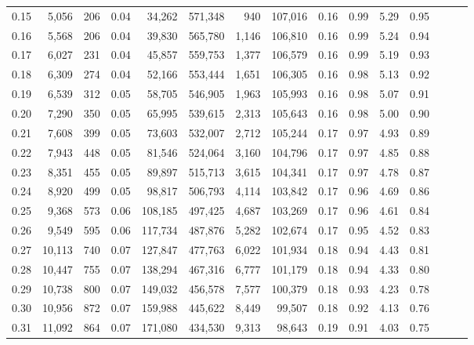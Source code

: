 \begin{tabular}{rrrrrrrrrrrrrrr}
0.15 &   5,056 &    206 &  0.04 &   34,262 &  571,348 &      940 &  107,016 &  0.16 &  0.99 &  5.29 &      0.95 \\
0.16 &   5,568 &    206 &  0.04 &   39,830 &  565,780 &    1,146 &  106,810 &  0.16 &  0.99 &  5.24 &      0.94 \\
0.17 &   6,027 &    231 &  0.04 &   45,857 &  559,753 &    1,377 &  106,579 &  0.16 &  0.99 &  5.19 &      0.93 \\
0.18 &   6,309 &    274 &  0.04 &   52,166 &  553,444 &    1,651 &  106,305 &  0.16 &  0.98 &  5.13 &      0.92 \\
0.19 &   6,539 &    312 &  0.05 &   58,705 &  546,905 &    1,963 &  105,993 &  0.16 &  0.98 &  5.07 &      0.91 \\
0.20 &   7,290 &    350 &  0.05 &   65,995 &  539,615 &    2,313 &  105,643 &  0.16 &  0.98 &  5.00 &      0.90 \\
0.21 &   7,608 &    399 &  0.05 &   73,603 &  532,007 &    2,712 &  105,244 &  0.17 &  0.97 &  4.93 &      0.89 \\
0.22 &   7,943 &    448 &  0.05 &   81,546 &  524,064 &    3,160 &  104,796 &  0.17 &  0.97 &  4.85 &      0.88 \\
0.23 &   8,351 &    455 &  0.05 &   89,897 &  515,713 &    3,615 &  104,341 &  0.17 &  0.97 &  4.78 &      0.87 \\
0.24 &   8,920 &    499 &  0.05 &   98,817 &  506,793 &    4,114 &  103,842 &  0.17 &  0.96 &  4.69 &      0.86 \\
0.25 &   9,368 &    573 &  0.06 &  108,185 &  497,425 &    4,687 &  103,269 &  0.17 &  0.96 &  4.61 &      0.84 \\
0.26 &   9,549 &    595 &  0.06 &  117,734 &  487,876 &    5,282 &  102,674 &  0.17 &  0.95 &  4.52 &      0.83 \\
0.27 &  10,113 &    740 &  0.07 &  127,847 &  477,763 &    6,022 &  101,934 &  0.18 &  0.94 &  4.43 &      0.81 \\
0.28 &  10,447 &    755 &  0.07 &  138,294 &  467,316 &    6,777 &  101,179 &  0.18 &  0.94 &  4.33 &      0.80 \\
0.29 &  10,738 &    800 &  0.07 &  149,032 &  456,578 &    7,577 &  100,379 &  0.18 &  0.93 &  4.23 &      0.78 \\
0.30 &  10,956 &    872 &  0.07 &  159,988 &  445,622 &    8,449 &   99,507 &  0.18 &  0.92 &  4.13 &      0.76 \\
0.31 &  11,092 &    864 &  0.07 &  171,080 &  434,530 &    9,313 &   98,643 &  0.19 &  0.91 &  4.03 &      0.75 \\

\end{tabular}
